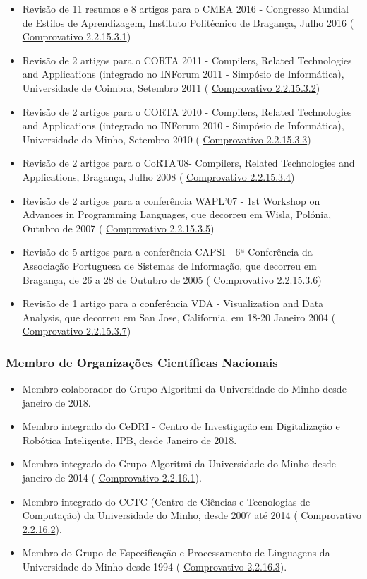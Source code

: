 \documentclass[11pt]{article}
\begin{document}
\begin{itemize}
\item{Revisão de 11 resumos e 8 artigos para o CMEA 2016 - Congresso Mundial de Estilos de Aprendizagem, Instituto Politécnico de Bragança, Julho 2016 (
\href{run:ComprovativosCOCP/revisoes/CMEA2016.pdf}{Comprovativo 2.2.15.3.1})}
\item{Revisão de 2 artigos para o CORTA 2011 - Compilers, Related Technologies and Applications (integrado no INForum 2011 - Simpósio de Informática), Universidade de Coimbra, Setembro 2011 (
\href{run:ComprovativosCOCP/revisoes/CORTA2011.pdf}{Comprovativo 2.2.15.3.2})}
\item{Revisão de 2 artigos para o CORTA 2010 - Compilers, Related Technologies and Applications (integrado no INForum 2010 - Simpósio de Informática), Universidade do Minho, Setembro 2010 (
\href{run:ComprovativosCOCP/revisoes/CORTA2010.pdf}{Comprovativo 2.2.15.3.3})}
\item{Revisão de 2 artigos para o CoRTA'08- Compilers, Related Technologies and Applications, Bragança, Julho 2008 (
\href{run:ComprovativosCOCP/revisoes/CORTA2008.pdf}{Comprovativo 2.2.15.3.4})}
\item{Revisão de 2 artigos para a conferência WAPL'07 - 1st Workshop on Advances in Programming Languages, que decorreu em Wisla, Polónia, Outubro de 2007 (
\href{run:ComprovativosCOCP/revisoes/WAPL2007.pdf}{Comprovativo 2.2.15.3.5})}
\item{Revisão de 5 artigos para a conferência CAPSI - 6ª Conferência da Associação Portuguesa de Sistemas de Informação, que decorreu em Bragança, de 26 a 28 de Outubro de 2005 (
\href{run:ComprovativosCOCP/revisoes/CAPSI2005.pdf}{Compro{}vativo 2.2.15.3.6})}
\item{Revisão de 1 artigo para a conferência VDA - Visualization and Data Analysis, que decorreu em San Jose, California, em 18-20 Janeiro 2004 (
\href{run:ComprovativosCOCP/revisoes/VDA2004.pdf}{Comprovativo 2.2.15.3.7})}
\end{itemize}
\subsubsection{Membro de Organizações Científicas Nacionais}
\begin{itemize}
\item{Membro colaborador do Grupo Algoritmi da Universidade do Minho desde janeiro de 2018.}
\item{Membro integrado do CeDRI - Centro de Investigação em Digitalização e Robótica Inteligente, IPB, desde Janeiro de 2018.}
\item{Membro integrado do Grupo Algoritmi da Universidade do Minho desde janeiro de 2014 (
\href{run:OutrasActCientif/algoritmi.pdf}{Comprovativo 2.2.16.1}).}
\item{Membro integrado do CCTC (Centro de Ciências e Tecnologias de Computação) da Universidade do Minho, desde 2007 até 2014 (
\href{run:OutrasActCientif/cctc.pdf}{Comprovativo 2.2.16.2}).}
\item{Membro do Grupo de Especificação e Processamento de Linguagens da Universidade do Minho desde 1994 (
\href{run:OutrasActCientif/gepl.pdf}{Comprovativo 2.2.16.3}).}
\end{itemize}
\end{document}
